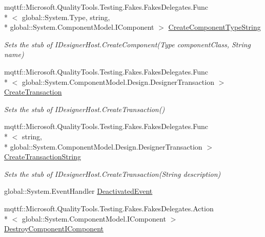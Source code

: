 \begin{DoxyCompactItemize}
mqttf\-::\-Microsoft.\-Quality\-Tools.\-Testing.\-Fakes.\-Fakes\-Delegates.\-Func\\*
$<$ global\-::\-System.\-Type, string, \\*
global\-::\-System.\-Component\-Model.\-I\-Component $>$ \hyperlink{class_system_1_1_component_model_1_1_design_1_1_fakes_1_1_stub_i_designer_host_a3bd9c9ec66339f4ee632848a325f2815}{Create\-Component\-Type\-String}
\begin{DoxyCompactList}\small\item\em Sets the stub of I\-Designer\-Host.\-Create\-Component(\-Type component\-Class, String name)\end{DoxyCompactList}\item 
mqttf\-::\-Microsoft.\-Quality\-Tools.\-Testing.\-Fakes.\-Fakes\-Delegates.\-Func\\*
$<$ global\-::\-System.\-Component\-Model.\-Design.\-Designer\-Transaction $>$ \hyperlink{class_system_1_1_component_model_1_1_design_1_1_fakes_1_1_stub_i_designer_host_ad3afbc50496e7d4ac8973925a6741ea1}{Create\-Transaction}
\begin{DoxyCompactList}\small\item\em Sets the stub of I\-Designer\-Host.\-Create\-Transaction()\end{DoxyCompactList}\item 
mqttf\-::\-Microsoft.\-Quality\-Tools.\-Testing.\-Fakes.\-Fakes\-Delegates.\-Func\\*
$<$ string, \\*
global\-::\-System.\-Component\-Model.\-Design.\-Designer\-Transaction $>$ \hyperlink{class_system_1_1_component_model_1_1_design_1_1_fakes_1_1_stub_i_designer_host_a1093c8e5dc6e9aa3957066263de2d7bd}{Create\-Transaction\-String}
\begin{DoxyCompactList}\small\item\em Sets the stub of I\-Designer\-Host.\-Create\-Transaction(\-String description)\end{DoxyCompactList}\item 
global\-::\-System.\-Event\-Handler \hyperlink{class_system_1_1_component_model_1_1_design_1_1_fakes_1_1_stub_i_designer_host_af269dcc059d5c963444ddf9af5ecbcf5}{Deactivated\-Event}
\item 
mqttf\-::\-Microsoft.\-Quality\-Tools.\-Testing.\-Fakes.\-Fakes\-Delegates.\-Action\\*
$<$ global\-::\-System.\-Component\-Model.\-I\-Component $>$ \hyperlink{class_system_1_1_component_model_1_1_design_1_1_fakes_1_1_stub_i_designer_host_a025b590b4f5314c0f764c6f51a7a849a}{Destroy\-Component\-I\-Component}

\end{DoxyCompactItemize}
